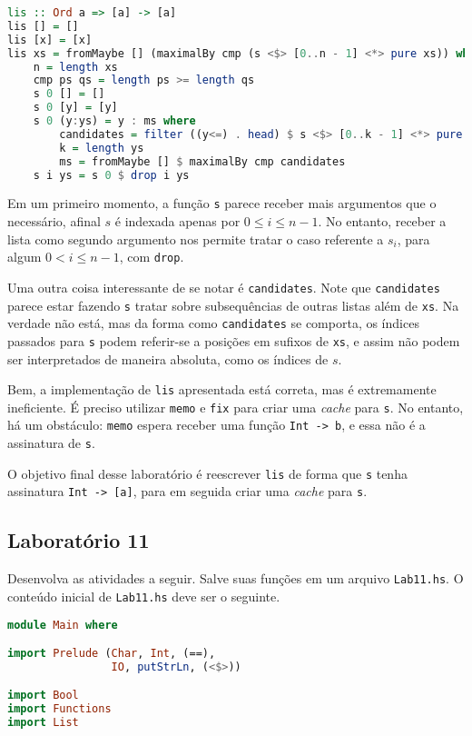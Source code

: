 \documentclass[a4paper]{article}
\begin{document}
\pagebreak

\begin{lstlisting}[language=haskell, frame=single]
lis :: Ord a => [a] -> [a]
lis [] = []
lis [x] = [x]
lis xs = fromMaybe [] (maximalBy cmp (s <$> [0..n - 1] <*> pure xs)) where
	n = length xs
	cmp ps qs = length ps >= length qs
	s 0 [] = []
	s 0 [y] = [y]
	s 0 (y:ys) = y : ms where
		candidates = filter ((y<=) . head) $ s <$> [0..k - 1] <*> pure ys
		k = length ys
		ms = fromMaybe [] $ maximalBy cmp candidates
	s i ys = s 0 $ drop i ys
\end{lstlisting}

Em um primeiro momento, a função \texttt{s} parece receber mais argumentos que o necessário, afinal $s$ é indexada apenas por $0 \leq i \leq n - 1$.
No entanto, receber a lista como segundo argumento nos permite tratar o caso referente a $s_i$, para algum $0 < i \leq n - 1$, com \texttt{drop}.

Uma outra coisa interessante de se notar é \texttt{candidates}.
Note que \texttt{candidates} parece estar fazendo \texttt{s} tratar sobre subsequências de outras listas além de \texttt{xs}.
Na verdade não está, mas da forma como \texttt{candidates} se comporta, os índices passados para \texttt{s} podem referir-se a posições em sufixos de \texttt{xs}, e assim não podem ser interpretados de maneira absoluta, como os índices de $s$.

Bem, a implementação de \texttt{lis} apresentada está correta, mas é extremamente ineficiente.
É preciso utilizar \texttt{memo} e \texttt{fix} para criar uma \emph{cache} para \texttt{s}.
No entanto, há um obstáculo: \texttt{memo} espera receber uma função \texttt{Int -> b}, e essa não é a assinatura de \texttt{s}.

O objetivo final desse laboratório é reescrever \texttt{lis} de forma que \texttt{s} tenha assinatura \mbox{\texttt{Int -> [a]}}, para em seguida criar uma \emph{cache} para \texttt{s}.

\subsection{Laboratório 11}

Desenvolva as atividades a seguir.
Salve suas funções em um arquivo \texttt{Lab11.hs}.
O conteúdo inicial de \texttt{Lab11.hs} deve ser o seguinte.

\begin{lstlisting}[language=haskell, frame=single]
module Main where

import Prelude (Char, Int, (==),
                IO, putStrLn, (<$>))

import Bool
import Functions
import List
\end{lstlisting}
\end{document}
